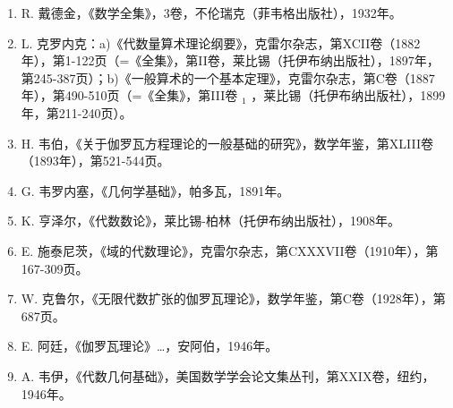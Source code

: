 \begin{enumerate}
  J. 刘维尔，《关于值既非代数数、甚至不可化为代数无理数的极广泛类别的量》，数学杂志（第一辑），第XVI卷（1851年），第133页。
\item
  R. 戴德金，《数学全集》，3卷，不伦瑞克（菲韦格出版社），1932年。
\item
  L. 克罗内克：a)《代数量算术理论纲要》，克雷尔杂志，第XCII卷（1882年），第1-122页（=《全集》，第II卷，莱比锡（托伊布纳出版社），1897年，第245-387页）；b)《一般算术的一个基本定理》，克雷尔杂志，第C卷（1887年），第490-510页（=《全集》，第III卷 \(_{1}\) ，莱比锡（托伊布纳出版社），1899年，第211-240页）。
\item
  H. 韦伯，《关于伽罗瓦方程理论的一般基础的研究》，数学年鉴，第XLIII卷（1893年），第521-544页。
\item
  G. 韦罗内塞，《几何学基础》，帕多瓦，1891年。
\item
  K. 亨泽尔，《代数数论》，莱比锡-柏林（托伊布纳出版社），1908年。
\item
  E. 施泰尼茨，《域的代数理论》，克雷尔杂志，第CXXXVII卷（1910年），第167-309页。
\item
  W. 克鲁尔，《无限代数扩张的伽罗瓦理论》，数学年鉴，第C卷（1928年），第687页。
\item
  E. 阿廷，《伽罗瓦理论》\ldots，安阿伯，1946年。
\item
  A. 韦伊，《代数几何基础》，美国数学学会论文集丛刊，第XXIX卷，纽约，1946年。
\end{enumerate}

